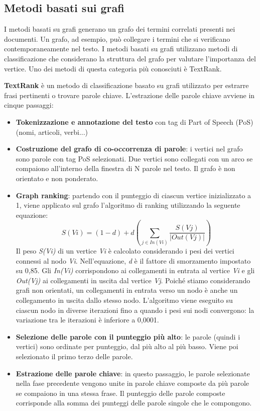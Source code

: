 \subsection{Metodi basati sui grafi}
I metodi basati su grafi generano un grafo dei termini correlati presenti nei documenti. Un grafo, ad esempio, può collegare i termini che si verificano contemporaneamente nel testo. I metodi basati su grafi utilizzano metodi di classificazione che considerano la struttura del grafo per valutare l'importanza del vertice. Uno dei metodi di questa categoria più conosciuti è TextRank.

\textbf{TextRank} è un metodo di classificazione basato su grafi utilizzato per estrarre frasi pertinenti o trovare parole chiave. L'estrazione delle parole chiave avviene in cinque passaggi:

\begin{itemize}
\item \textbf{Tokenizzazione e annotazione del testo} con tag di Part of Speech (PoS) (nomi, articoli, verbi...)
\item \textbf{Costruzione del grafo di co-occorrenza di parole}: i vertici nel grafo sono parole con tag PoS selezionati. Due vertici sono collegati con un arco se compaiono all'interno della finestra di N parole nel testo. Il grafo è non orientato e non ponderato.
\item \textbf{Graph ranking}: partendo con il punteggio di ciascun vertice inizializzato a 1, viene applicato sul grafo l'algoritmo di ranking utilizzando la seguente equazione:
\begin{equation}
S(Vi)=(1 - d) + d\left (\sum_{j \in In(Vi)} \frac{S(Vj)}{|Out(Vj)|}\right )
\end{equation}
Il peso \textit{S(Vi)} di un vertice \textit{Vi} è calcolato considerando i pesi dei vertici connessi al nodo \textit{Vi}. Nell'equazione, \textit{d} è il fattore di smorzamento impostato su 0,85. Gli \textit{In(Vi)} corrispondono ai collegamenti in entrata al vertice \textit{Vi} e gli \textit{Out(Vj)} ai collegamenti in uscita dal vertice \textit{Vj}. Poiché stiamo considerando grafi non orientati, un collegamenti in entrata verso un nodo è anche un collegamento in uscita dallo stesso nodo. L'algoritmo viene eseguito su ciascun nodo in diverse iterazioni fino a quando i pesi sui nodi convergono: la variazione tra le iterazioni è inferiore a 0,0001.
\item \textbf{Selezione delle parole con il punteggio più alto}: le parole (quindi i vertici) sono ordinate per punteggio, dal più alto al più basso. Viene poi selezionato il primo terzo delle parole.
\item \textbf{Estrazione delle parole chiave}: in questo passaggio, le parole selezionate nella fase precedente vengono unite in parole chiave composte da più parole se compaiono in una stessa frase. Il punteggio delle parole composte corrisponde alla somma dei punteggi delle parole singole che le compongono.
\end{itemize}

